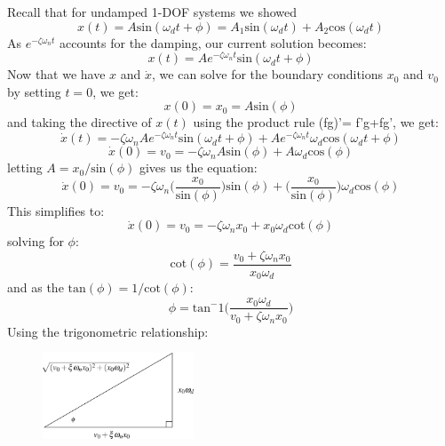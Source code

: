 \documentclass[12pt,a4paper]{article}
\begin{document}
			Recall that for undamped 1-DOF systems we showed 
			\begin{equation}
				x(t) = A\text{sin}(\omega_dt + \phi) = A_1\text{sin}(\omega_dt) + A_2\text{cos}(\omega_dt)
			\end{equation} 				
			As $e^{-\zeta\omega_nt}$ accounts for the damping, our current solution becomes:
			\begin{equation}
				x(t) = Ae^{-\zeta\omega_nt}\text{sin}(\omega_dt + \phi) 
			\end{equation} 		
			Now that we have $x$ and $\dot{x}$, we can solve for the boundary conditions $x_0$ and $v_0$ by setting $t=0$, we get:
			\begin{equation}
				x(0)=x_0 = A\text{sin}(\phi) 
			\end{equation} 			
			and taking the directive of $x(t)$ using the product rule (fg)'= f'g+fg', we get:
			\begin{equation}
				\dot{x}(t) = -\zeta\omega_nAe^{-\zeta\omega_nt}\text{sin}(\omega_dt + \phi) + Ae^{-\zeta\omega_nt}\omega_d\text{cos}(\omega_dt + \phi) 
			\end{equation} 
			\begin{equation}
				\dot{x}(0) =v_0= -\zeta\omega_nA\text{sin}(\phi) + A\omega_d\text{cos}(\phi) 
			\end{equation} 
			letting $A=x_0/\text{sin}(\phi)$ gives us the equation:
			\begin{equation}
				\dot{x}(0) =v_0= -\zeta\omega_n\bigg(\frac{x_0}{\text{sin}(\phi)}\bigg)\text{sin}(\phi) + \bigg(\frac{x_0}{\text{sin}(\phi)}\bigg)\omega_d\text{cos}(\phi) 
			\end{equation} 			
			This simplifies to:
			\begin{equation}
				\dot{x}(0) = v_0 = -\zeta\omega_nx_0 + x_0\omega_d\text{cot}(\phi) 
			\end{equation} 	
			solving for $\phi$:
			\begin{equation}
				\text{cot}(\phi) = \frac{v_0 +\zeta\omega_nx_0}{x_0\omega_d} 
			\end{equation} 	
			and as the $\text{tan}(\phi) = 1/\text{cot}(\phi)$: 
			\begin{equation}
				\phi = \text{tan}^-1\Bigg(\frac{x_0\omega_d}{v_0+\zeta\omega_nx_0}\Bigg)
			\end{equation} 				
			Using the trigonometric relationship:
			\begin{figure}[H]
				\centering
				\includegraphics[width=0.4\textwidth]{../../Figures/Trigonometric_relationship_underdamped.png}
			\end{figure}
\end{document}

